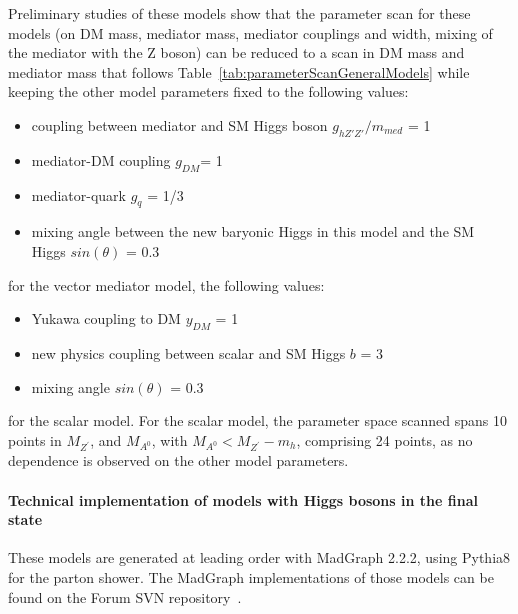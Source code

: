 \documentclass[a4,debug,notitlepage,nobib]{tufte-handout}
\newcommand{\mmed}{\ensuremath{m_{med}}\xspace}
\newcommand{\gdm}{\ensuremath{g_{DM}}\xspace}
\begin{document}
Preliminary studies of these models show that the parameter scan for 
these models (on DM mass, mediator mass, mediator couplings and
width, mixing of the mediator with the Z boson) can be reduced to 
a scan in DM mass and mediator mass that follows Table~\ref{tab:parameterScanGeneralModels} while keeping 
the other model parameters fixed to the following values: 
\begin{itemize}
 \item coupling between mediator and SM Higgs boson $g_{hZ'Z'}/ \mmed$ = 1
 \item mediator-DM coupling \gdm = 1
 \item mediator-quark $g_{q}$ = 1/3
 \item mixing angle between the new baryonic Higgs in this model and the SM Higgs $sin(\theta)$ = 0.3
\end{itemize}
for the vector mediator model, the following values: 
\begin{itemize}
 \item Yukawa coupling to DM $y_{DM}$ = 1
 \item new physics coupling between scalar and SM Higgs $b$ = 3
 \item mixing angle $sin(\theta)$ = 0.3
\end{itemize}
for the scalar model. 
For the scalar model, the parameter space scanned spans 10 points in $M_{Z^\prime}$, and $M_{A^0}$, with $M_{A^0} < M_{Z^\prime}-m_h$,
comprising 24 points, as no dependence is observed on the other model parameters.  


\paragraph{Technical implementation of models with Higgs bosons in the final state} 

These models are generated at leading
order with MadGraph 2.2.2, using Pythia8 for the parton shower.
The MadGraph implementations of those models can be found on the Forum SVN 
repository~\cite{ForumSVN_EWMonoHiggs}.


\end{document}
